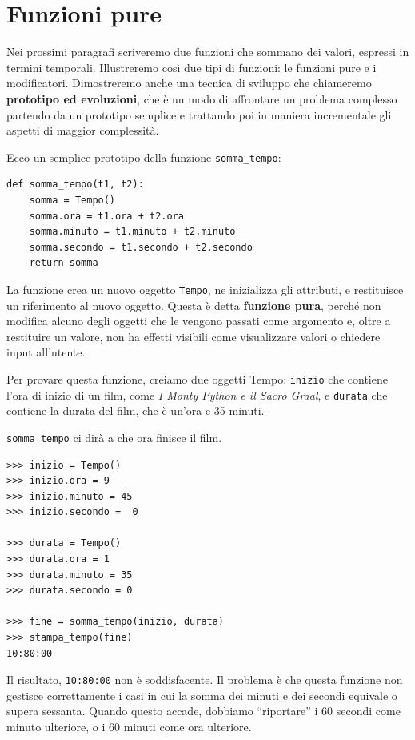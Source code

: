 \documentclass[10pt]{book}
\begin{document}
\section{Funzioni pure}

Nei prossimi paragrafi scriveremo due funzioni che sommano dei valori, espressi in termini temporali. Illustreremo così due tipi di funzioni: le funzioni pure e i modificatori. Dimostreremo anche una tecnica di sviluppo che chiameremo {\bf prototipo ed evoluzioni}, che è un modo di affrontare un problema complesso partendo da un prototipo semplice e trattando poi in maniera incrementale gli aspetti di maggior complessità.

Ecco un semplice prototipo della funzione \verb"somma_tempo":

\begin{verbatim}
def somma_tempo(t1, t2):
    somma = Tempo()
    somma.ora = t1.ora + t2.ora
    somma.minuto = t1.minuto + t2.minuto
    somma.secondo = t1.secondo + t2.secondo
    return somma
\end{verbatim}
%
La funzione crea un nuovo oggetto {\tt Tempo}, ne inizializza gli attributi, e restituisce un riferimento al nuovo oggetto. Questa è detta {\bf funzione pura},  perché non modifica alcuno degli oggetti che le vengono passati come argomento e, oltre a restituire un valore, non ha effetti visibili come visualizzare valori o chiedere input all'utente.

Per provare questa funzione, creiamo due oggetti Tempo: {\tt inizio}
che contiene l'ora di inizio di un film, come {\em I Monty Python e il Sacro Graal}, e {\tt durata} che contiene la durata del film, che è un'ora e 35 minuti.

\verb"somma_tempo" ci dirà a che ora finisce il film.

\begin{verbatim}
>>> inizio = Tempo()
>>> inizio.ora = 9
>>> inizio.minuto = 45
>>> inizio.secondo =  0

>>> durata = Tempo()
>>> durata.ora = 1
>>> durata.minuto = 35
>>> durata.secondo = 0

>>> fine = somma_tempo(inizio, durata)
>>> stampa_tempo(fine)
10:80:00
\end{verbatim}
%
Il risultato, {\tt 10:80:00} non è soddisfacente. Il problema è che questa funzione non gestisce correttamente i casi in cui la somma dei minuti e dei secondi equivale o supera sessanta. Quando questo accade, dobbiamo ``riportare'' i 60 secondi come minuto ulteriore, o i 60 minuti come ora ulteriore.
\end{document}
